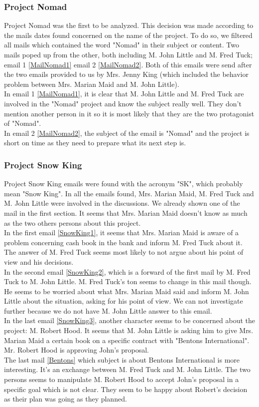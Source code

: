 \subsubsection{Project Nomad}
Project Nomad was the first to be analyzed. This decision was made according to the mails dates found concerned on the name of the project. To do so, we filtered all mails which contained the word "Nomad" in their subject or content. Two mails poped up from the other, both including M. John Little and M. Fred Tuck; email 1 \ref{MailNomad1} email 2 \ref{MailNomad2}. Both of this emails were send after the two emails provided to us by Mrs. Jenny King (which included the behavior problem between Mrs. Marian Maid and M. John Little).\\
In email 1 \ref{MailNomad1}, it is clear that M. John Little and M. Fred Tuck are involved in the "Nomad" project and know the subject really well. They don't mention another person in it so it is most likely that they are the two protagonist of "Nomad".\\
In email 2 \ref{MailNomad2}, the subject of the email is "Nomad" and the project is short on time as they need to prepare what its next step is.

\subsubsection{Project Snow King}
Project Snow King emails were found with the acronym "SK", which probably mean "Snow King". In all the emails found, Mrs. Marian Maid, M. Fred Tuck and M. John Little were involved in the discussions. We already shown one of the mail in the first section. It seems that Mrs. Marian Maid doesn't know as much as the two others persons about this project.\\
In the first email \ref{SnowKing1}, it seems that Mrs. Marian Maid is aware of a problem concerning cash book in the bank and inform M. Fred Tuck about it. The answer of M. Fred Tuck seems most likely to not argue about his point of view and his decisions.\\
In the second email \ref{SnowKing2}, which is a forward of the first mail by M. Fred Tuck to M. John Little. M. Fred Tuck's ton seems to change in this mail though. He seems to be worried about what Mrs. Marian Maid said and inform M. John Little about the situation, asking for his point of view. We can not investigate further because we do not have M. John Little answer to this email.\\
In the last email \ref{SnowKing3}, another character seems to be concerned about the project: M. Robert Hood. It seems that M. John Little is asking him to give Mrs. Marian Maid a certain book on a specific contract with "Bentons International". Mr. Robert Hood is approving John's proposal.\\
The last mail \ref{Bentons} which subject is about Bentons International is more interesting. It's an exchange between M. Fred Tuck and M. John Little. The two persons seems to manipulate M. Robert Hood to accept John's proposal in a specific goal which is not clear. They seem to be happy about Robert's decision as their plan was going as they planned.